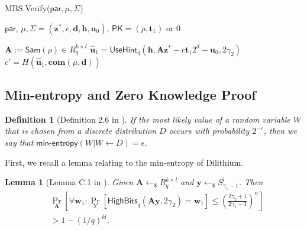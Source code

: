 \documentclass[conference]{IEEEtran}
\newtheorem{lemma}[theorem]{Lemma}
\newtheorem{definition}{Definition}[section]
\begin{document}
	\begin{algorithm}[pt]
		\caption{\textsf{MBS.Verify}($\mathsf{par},\mu, \Sigma$)} \label{alg:3}
		
		\begin{algorithmic}[1]
			\REQUIRE $\mathsf{par}$, $\mu, \Sigma= (\mathbf{z}^*,c, \mathbf{d}, \mathbf{h}, \mathbf{u}_0)$, $\textsf{PK}=( \rho,\mathbf{t}_1)$
			 or 0
			
			\STATE $\mathbf{A} :=\textsf{Sam}(\rho)\in R_q^{k \times l}$
			\STATE $\widehat{\mathbf{u}}_1=\textsf{UseHint}_q(\mathbf{h}, \mathbf{A}\mathbf{z}^* -c \mathbf{t}_1  2^d- \mathbf{u}_0,2\gamma_2)$
			\STATE $c'=H(\widehat{\mathbf{u}}_1, \mathbf{com}(\mu, \mathbf{d}))$
			\ELSE
			\ENDIF
			
		\end{algorithmic}
		\label{verify}
	\end{algorithm}
	\normalsize
	
	
	
	\subsection{ Min-entropy and Zero Knowledge Proof}  \label{minen}
	
	
	\begin{definition}[Definition 2.6 in \cite{KLS18}] 
		If the most likely value of a random variable $W$ that is chosen from a discrete distribution $D$ occurs with probability $2^{-\epsilon}$, then we say that $\textsf{min-entropy}(W|W \leftarrow D)=\epsilon$.
	\end{definition}
	
	First, we recall a lemma relating to the min-entropy of \textsf{Dilithium}. 
	
	\begin{lemma}[Lemma C.1 in \cite{KLS18}] \label{lem3} 
		Given $\mathbf{A} \leftarrow_{\$} R_q^{k \times l}$ and $\mathbf{y}\leftarrow_{\$} S_{\gamma_1-1}^l$. Then
		\begin{equation}
		\begin{split}
		&\Pr_{\mathbf{A}}\left[ \forall \mathbf{w}_1:\Pr_{\mathbf{y}}[\mathsf{HighBits}_q(\mathbf{A} \mathbf{y}, 2\gamma_2)=\mathbf{w}_1] \leq \left(\frac{2\gamma_2+1}{2\gamma_1-1}\right)^n\right] \\
		&> 1-(1/q)^{kl}. \label{k18}
		\end{split}
	\end{equation}
	\end{lemma}
	
\end{document}
